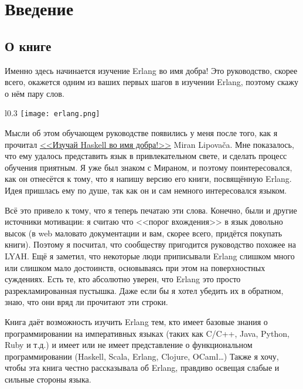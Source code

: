 \chapter{Введение}\label{introduction}

\section{О книге}

Именно здесь начинается изучение Erlang во имя добра!
Это руководство, скорее всего, окажется одним из ваших первых шагов в изучении Erlang, поэтому скажу о нём пару слов.

\begin{wrapfigure}{l}{0.3\linewidth}
    \texttt{[image: erlang.png]}
\end{wrapfigure}

Мысли об этом обучающем руководстве появились у меня после того, как я прочитал \href{http://learnyouahaskell.com}{<<Изучай Haskell во имя добра!>>} Miran Lipova\v{c}a.
Мне показалось, что ему удалось представить язык в привлекательном свете, и сделать процесс обучения приятным.
Я уже был знаком с Мираном, и поэтому поинтересовался, как он отнесётся к тому, что я напишу версию его книги, посвящённую Erlang.
Идея пришлась ему по душе, так как он и сам немного интересовался языком.

Всё это привело к тому, что я теперь печатаю эти слова.
Конечно, были и другие источники мотивации: я считаю что <<порог вхождения>> в язык довольно высок (в web маловато документации и вам, скорее всего, придётся покупать книги).
Поэтому я посчитал, что сообществу пригодится руководство похожее на LYAH.
Ещё я заметил, что некоторые люди приписывали Erlang слишком много или слишком мало достоинств, основываясь при этом на поверхностных суждениях.
Есть те, кто абсолютно уверен, что Erlang это просто разрекламированная пустышка.
Даже если бы я хотел убедить их в обратном, знаю, что они вряд ли прочитают эти строки.

Книга даёт возможность изучить Erlang тем, кто имеет базовые знания о программировании на императивных языках (таких как C/C++, Java, Python, Ruby и т.д.) и имеет или не имеет представление о функциональном программировании (Haskell, Scala, Erlang, Clojure, OCaml\ldots)
Также я хочу, чтобы эта книга честно рассказывала об Erlang, правдиво освещая слабые и сильные стороны языка.

